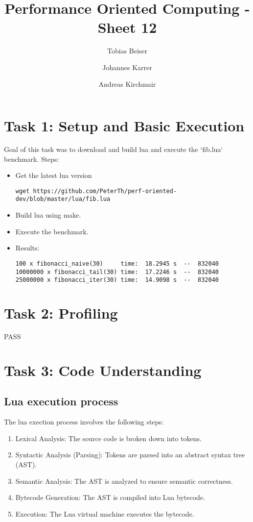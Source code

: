 \documentclass{article}
\title{Performance Oriented Computing - Sheet 12}
\author{Tobias Beiser \and Johannes Karrer \and Andreas Kirchmair}
\begin{document}
	\maketitle
	\section{Task 1: Setup and Basic Execution}
	Goal of this task was to download and build lua and execute the `fib.lua` benchmark.
	Steps:
	\begin{itemize}
		\item Get the latest lua version
		\begin{verbatim}
wget https://github.com/PeterTh/perf-oriented-dev/blob/master/lua/fib.lua			
		\end{verbatim}
		\item Build lua using make.
		\item Execute the benchmark.
		\item Results:
		\begin{verbatim}
100 x fibonacci_naive(30)     time:  18.2945 s  --  832040
10000000 x fibonacci_tail(30) time:  17.2246 s  --  832040
25000000 x fibonacci_iter(30) time:  14.9098 s  --  832040		
		\end{verbatim}
	\end{itemize}
	\section{Task 2: Profiling}
	PASS
	\section{Task 3: Code Understanding}
	\subsection{Lua execution process}
	The lua exection process involves the following steps:
	\begin{enumerate}
		\item Lexical Analysis: The source code is broken down into tokens.
		\item Syntactic Analysis (Parsing): Tokens are parsed into an abstract syntax tree (AST).
		\item Semantic Analysis: The AST is analyzed to ensure semantic correctness.
		\item Bytecode Generation: The AST is compiled into Lua bytecode.
		\item Execution: The Lua virtual machine executes the bytecode.
	\end{enumerate}
	
\end{document}
